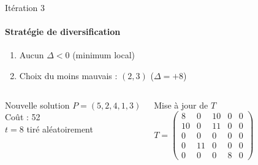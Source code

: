 \documentclass[10pt, handout]{beamer}
\begin{document}
\begin{frame}{Itération 3}
    \framesubtitle{Stratégie de diversification}


    \begin{enumerate}
        \item Aucun \( \Delta < 0 \) (minimum local)
        \item Choix du moins mauvais : \( (2,3) \) (\( \Delta = +8 \))
    \end{enumerate}

    \begin{columns}
        \begin{alertblock}{Nouvelle solution}
            \( P = (5, 2, 4, 1, 3) \) \\
            Coût : 52 \\
            \( t = 8 \) tiré aléatoirement
        \end{alertblock}

        \begin{exampleblock}{Mise à jour de \( T \)}
            \[
                T = \begin{pmatrix}
                    8  & 0  & 10 & 0 & 0 \\
                    10 & 0  & 11 & 0 & 0 \\
                    0  & 0  & 0  & 0 & 0 \\
                    0  & 11 & 0  & 0 & 0 \\
                    0  & 0  & 0  & 8 & 0
                \end{pmatrix}
            \]
        \end{exampleblock}
    \end{columns}
\end{frame}
\end{document}
